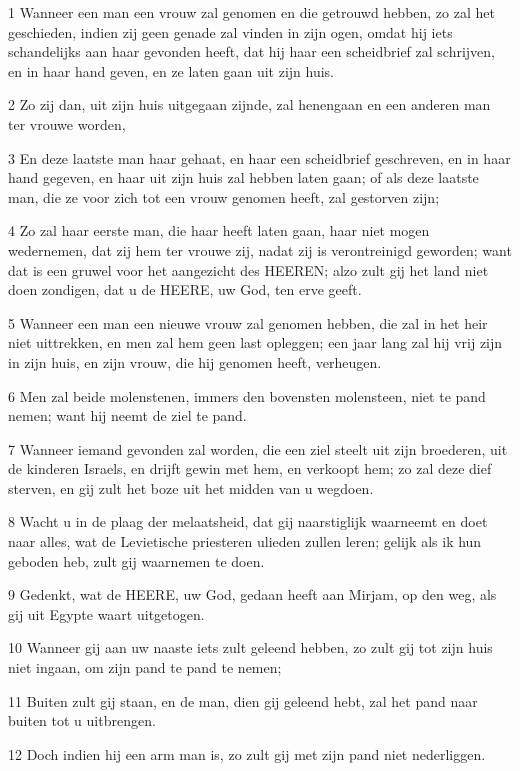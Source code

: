 \par 1 Wanneer een man een vrouw zal genomen en die getrouwd hebben, zo zal het geschieden, indien zij geen genade zal vinden in zijn ogen, omdat hij iets schandelijks aan haar gevonden heeft, dat hij haar een scheidbrief zal schrijven, en in haar hand geven, en ze laten gaan uit zijn huis.
\par 2 Zo zij dan, uit zijn huis uitgegaan zijnde, zal henengaan en een anderen man ter vrouwe worden,
\par 3 En deze laatste man haar gehaat, en haar een scheidbrief geschreven, en in haar hand gegeven, en haar uit zijn huis zal hebben laten gaan; of als deze laatste man, die ze voor zich tot een vrouw genomen heeft, zal gestorven zijn;
\par 4 Zo zal haar eerste man, die haar heeft laten gaan, haar niet mogen wedernemen, dat zij hem ter vrouwe zij, nadat zij is verontreinigd geworden; want dat is een gruwel voor het aangezicht des HEEREN; alzo zult gij het land niet doen zondigen, dat u de HEERE, uw God, ten erve geeft.
\par 5 Wanneer een man een nieuwe vrouw zal genomen hebben, die zal in het heir niet uittrekken, en men zal hem geen last opleggen; een jaar lang zal hij vrij zijn in zijn huis, en zijn vrouw, die hij genomen heeft, verheugen.
\par 6 Men zal beide molenstenen, immers den bovensten molensteen, niet te pand nemen; want hij neemt de ziel te pand.
\par 7 Wanneer iemand gevonden zal worden, die een ziel steelt uit zijn broederen, uit de kinderen Israels, en drijft gewin met hem, en verkoopt hem; zo zal deze dief sterven, en gij zult het boze uit het midden van u wegdoen.
\par 8 Wacht u in de plaag der melaatsheid, dat gij naarstiglijk waarneemt en doet naar alles, wat de Levietische priesteren ulieden zullen leren; gelijk als ik hun geboden heb, zult gij waarnemen te doen.
\par 9 Gedenkt, wat de HEERE, uw God, gedaan heeft aan Mirjam, op den weg, als gij uit Egypte waart uitgetogen.
\par 10 Wanneer gij aan uw naaste iets zult geleend hebben, zo zult gij tot zijn huis niet ingaan, om zijn pand te pand te nemen;
\par 11 Buiten zult gij staan, en de man, dien gij geleend hebt, zal het pand naar buiten tot u uitbrengen.
\par 12 Doch indien hij een arm man is, zo zult gij met zijn pand niet nederliggen.
